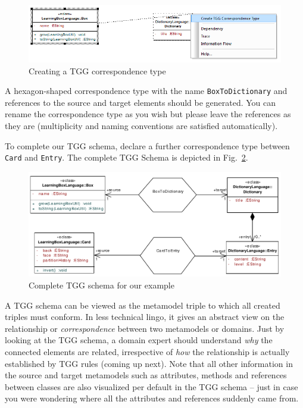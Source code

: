 \begin{figure}[htbp]
\begin{center}
  \includegraphics[width=\textwidth]{pics/tggBilder/tggSchema/tgg5}
  \caption{Creating a TGG correspondence type} 
  \label{fig:create_correspondence}
\end{center}
\end{figure}

A hexagon-shaped correspondence type with the name \texttt{BoxToDiction\-ary} and references to the source and target elements should be generated.
You can rename the correspondence type as you wish but please leave the references as they are (multiplicity and naming conventions are satisfied automatically).

To complete our TGG schema, declare a further correspondence type between \texttt{Card} and \texttt{Entry}.
The complete TGG Schema is depicted in Fig.~\ref{fig:complete_tgg_schema}.

\begin{figure}[htbp]
\begin{center}
  \includegraphics[width=\textwidth]{pics/tggBilder/tggSchema/tgg7}
  \caption{Complete TGG schema for our example}
  \label{fig:complete_tgg_schema}
\end{center}
\end{figure}

A TGG schema can be viewed as the metamodel triple to which all created triples must conform.
In less technical lingo, it gives an abstract view on the relationship or \emph{correspondence} between two metamodels or domains.
Just by looking at the TGG schema, a domain expert should understand \emph{why} the connected elements are related, irrespective of \emph{how} the relationship is actually established by TGG rules (coming up next).
Note that all other information in the source and target metamodels such as attributes, methods and references between classes are also visualized per default in the TGG schema -- just in case you were wondering where all the attributes and references suddenly came from.